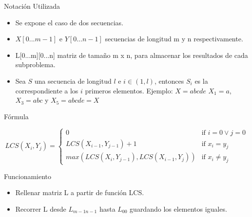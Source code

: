 \documentclass{beamer}
\begin{document}
			
				\begin{frame}{Notación Utilizada}
 			
					\begin{itemize}
			
						\item Se expone el caso de dos secuencias.

						\item $X[0...m-1]$ e $Y[0...n-1]$  secuencias de longitud m y n respectivamente. 	
				
						\item L[0...m][0...n] matriz de tamaño m x n, para almacenar los resultados de cada subproblema.
  					
						\item Sea $S$ una secuencia de longitud $l$  e $i \in (1, l)$, entonces $S_{i}$ es la correspondiente a los $i$ primeros elementos. 
			\newline{}
			Ejemplo: $X = abcde$
			\newline{}
			$X_{1} = a$, $X_{3} = abc$ y $X_{5} = abcde = X$
					\end{itemize}
			
				\end{frame}			

			
				\begin{frame}{Fórmula}
 			
					\[
			 		LCS( X_{i}, Y_{j} ) =
						\begin{cases}
				    			0									& \text{if } i = 0 \vee	 j = 0\\
    							LCS( X_{i-1}, Y_{j-1}) + 1					& \text{if } x_{i} = y_{j}\\
    							max(LCS( X_{i}, Y_{j-1}), LCS( X_{i-1}, Y_{j}))	& \text{if } x_{i} \not = y_{j}
						\end{cases}
					\]
			
				\end{frame}

				\begin{frame}{Funcionamiento}
 			
					\begin{itemize}
			
						\item Rellenar matriz L a partir de función LCS.
				
						\item Recorrer L desde $L_{m-1n-1}$ hasta $L_{00}$ guardando los elementos iguales.
  					
					\end{itemize}	
					
				\end{frame}
				
\end{document}
